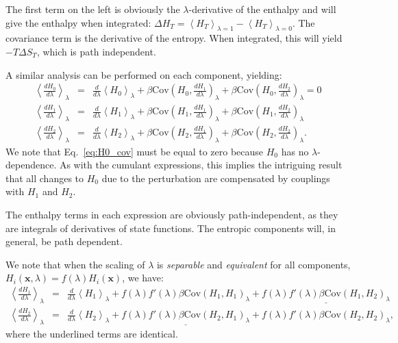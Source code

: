 \documentclass[%
 preprint,
 amsmath,amssymb,
 aps,
]{revtex4-1}
\renewcommand{\vec}[1]{{\mathbf{#1}}}
\begin{document}
The first term on the left is obviously the $\lambda$-derivative of the enthalpy and will give the enthalpy when integrated: $\Delta H_T = \left<H_T\right>_{\lambda=1} - \left<H_T\right>_{\lambda=0}$. The covariance term is the derivative of the entropy. When integrated, this will yield $-T\Delta S_T$, which is path independent.

A similar analysis can be performed on each component, yielding:
\begin{eqnarray}
\left<\frac{dH_0}{d\lambda}\right>_\lambda &=& 
\frac{d}{d\lambda}\left<H_0\right>_\lambda +
\beta\mathrm{Cov}\left(H_0, \frac{dH_1}{d\lambda} \right)_\lambda+
\beta\mathrm{Cov}\left(H_0, \frac{dH_2}{d\lambda} \right)_\lambda \label{eq:H0_cov}=0\\
\left<\frac{dH_1}{d\lambda}\right>_\lambda &=& 
\frac{d}{d\lambda}\left<H_1\right>_\lambda +
\beta\mathrm{Cov}\left(H_1, \frac{dH_1}{d\lambda} \right)_\lambda+
\beta\mathrm{Cov}\left(H_1, \frac{dH_2}{d\lambda} \right)_\lambda\\
\left<\frac{dH_2}{d\lambda}\right>_\lambda &=& 
\frac{d}{d\lambda}\left<H_2\right>_\lambda +
\beta\mathrm{Cov}\left(H_2, \frac{dH_1}{d\lambda} \right)_\lambda+
\beta\mathrm{Cov}\left(H_2, \frac{dH_2}{d\lambda} \right)_\lambda.
\end{eqnarray}
We note that Eq.~\ref{eq:H0_cov} must be equal to zero because $H_0$ has no $\lambda$-dependence. As with the cumulant expressions, this implies the intriguing result that all changes to $H_0$ due to the perturbation are compensated by couplings with $H_1$ and $H_2$.

The enthalpy terms in each expression are obviously path-independent, as they are integrals of derivatives of state functions. The entropic components will, in general, be path dependent.

We note that when the scaling of $\lambda$ is \emph{separable} and \emph{equivalent} for all components, 
$H_i \left( \vec{x}, \lambda \right) = f(\lambda) H_i \left( \vec{x}\right) $, we have:
\begin{eqnarray}
\left<\frac{dH_1}{d\lambda}\right>_\lambda &=& 
\frac{d}{d\lambda}\left<H_1\right>_\lambda +
f(\lambda)f'(\lambda)\beta\mathrm{Cov}\left(H_1,H_1\right)_\lambda+
\underline{f(\lambda)f'(\lambda)\beta\mathrm{Cov}\left(H_1,H_2\right)_\lambda}\\
\left<\frac{dH_2}{d\lambda}\right>_\lambda &=& 
\frac{d}{d\lambda}\left<H_2\right>_\lambda +
\underline{f(\lambda)f'(\lambda)\beta\mathrm{Cov}\left(H_2,H_1 \right)_\lambda}+
f(\lambda)f'(\lambda)\beta\mathrm{Cov}\left(H_2,H_2 \right)_\lambda,
\end{eqnarray}
where the underlined terms are identical.
\end{document}
